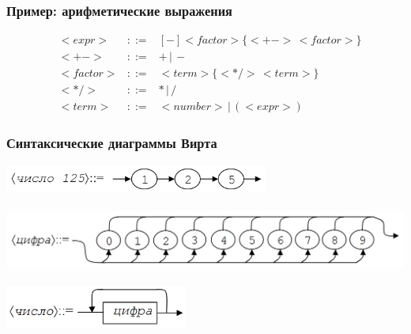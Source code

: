 \documentclass{beamer}
\begin{document}
\begin{frame}[fragile]
  \transwipe[direction=90]
  \frametitle{Пример: арифметические выражения}

$$
\begin{array}{crcl}
&<expr>& ::= & [-] <factor> \{ <+-> \, <factor> \} \\
&<+->& ::= & + \, | \, - \\
&<factor>& ::= & <term> \{ <*/> \, <term> \} \\
&<*/>& ::= & * \, | \, / \\
&<term>& ::= & <number> \, | \, ( <expr> )
\end{array}
$$

\end{frame}

\begin{frame}[fragile]
  \transwipe[direction=90]
  \frametitle{Синтаксические диаграммы Вирта}
\begin{center}
  \includegraphics[width=0.65\textwidth]{pics/sdseq.png}  \\~\\     \pause
  \includegraphics[width=1.0\textwidth]{pics/sddig.png}  \\~\\  \pause   
  \includegraphics[width=0.45\textwidth]{pics/sdnum.png}  
\end{center}
\end{frame}
\end{document}
